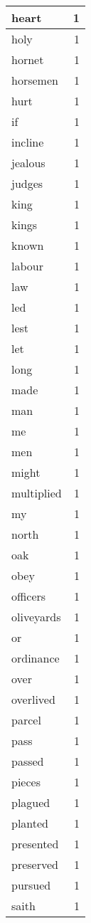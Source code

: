 \begin{center}
\begin{longtable}{l|r}
heart & 1 \\ \hline
holy & 1 \\ \hline
hornet & 1 \\ \hline
horsemen & 1 \\ \hline
hurt & 1 \\ \hline
if & 1 \\ \hline
incline & 1 \\ \hline
jealous & 1 \\ \hline
judges & 1 \\ \hline
king & 1 \\ \hline
kings & 1 \\ \hline
known & 1 \\ \hline
labour & 1 \\ \hline
law & 1 \\ \hline
led & 1 \\ \hline
lest & 1 \\ \hline
let & 1 \\ \hline
long & 1 \\ \hline
made & 1 \\ \hline
man & 1 \\ \hline
me & 1 \\ \hline
men & 1 \\ \hline
might & 1 \\ \hline
multiplied & 1 \\ \hline
my & 1 \\ \hline
north & 1 \\ \hline
oak & 1 \\ \hline
obey & 1 \\ \hline
officers & 1 \\ \hline
oliveyards & 1 \\ \hline
or & 1 \\ \hline
ordinance & 1 \\ \hline
over & 1 \\ \hline
overlived & 1 \\ \hline
parcel & 1 \\ \hline
pass & 1 \\ \hline
passed & 1 \\ \hline
pieces & 1 \\ \hline
plagued & 1 \\ \hline
planted & 1 \\ \hline
presented & 1 \\ \hline
preserved & 1 \\ \hline
pursued & 1 \\ \hline
saith & 1 \\ \hline

\end{longtable}
\end{center}
